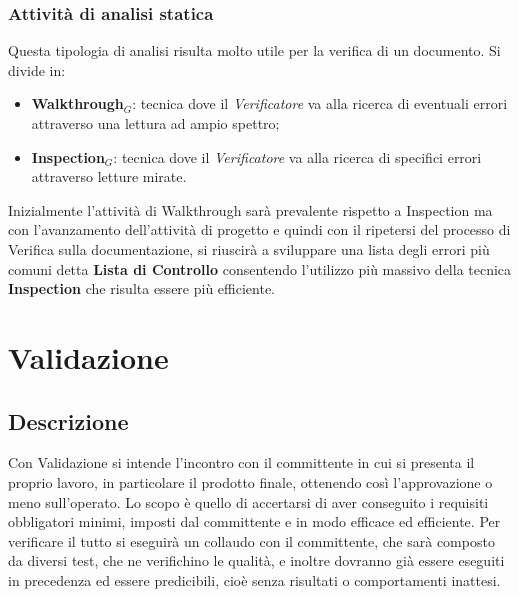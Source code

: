\subsubsection{Attività di analisi statica}
Questa tipologia di analisi risulta molto utile per la verifica di un documento. Si divide in:
\begin{itemize}
  \item \textbf{Walkthrough}$_G$: tecnica dove il \textit{Verificatore} va alla ricerca di eventuali errori attraverso una lettura ad ampio spettro;
  \item \textbf{Inspection}$_G$: tecnica dove il \textit{Verificatore} va alla ricerca di specifici errori attraverso letture mirate.
\end{itemize}
Inizialmente l'attività di Walkthrough sarà prevalente rispetto a Inspection ma
con l'avanzamento dell'attività di progetto e quindi con il ripetersi del processo di Verifica sulla documentazione, si riuscirà a sviluppare una lista degli errori più comuni detta \textbf{Lista di Controllo} consentendo l'utilizzo più massivo della tecnica \textbf{Inspection} che risulta essere più efficiente.

\section{Validazione}
\subsection{Descrizione}
Con Validazione si intende l'incontro con il committente in cui si presenta il proprio lavoro, in particolare il
prodotto finale, ottenendo così l'approvazione o meno sull'operato. \newline
Lo scopo è quello di accertarsi di aver conseguito i requisiti obbligatori minimi, imposti dal committente e
in modo efficace ed efficiente. Per verificare il tutto si eseguirà un collaudo con il committente, che sarà composto
da diversi test, che ne verifichino le qualità, e inoltre dovranno già essere eseguiti in precedenza ed essere
predicibili, cioè senza risultati o comportamenti inattesi.
